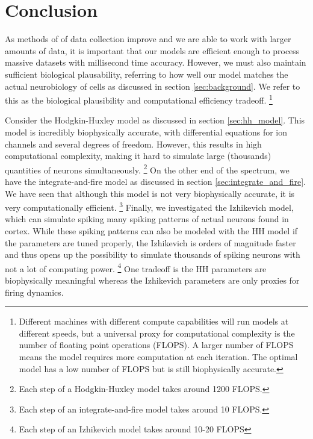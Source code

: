 \documentclass[11pt]{article}
\begin{document}
\nocite{computation-in-single-neuron-hh}

\section{Conclusion}
\label{sec:conclusion}

As methods of of data collection improve and we are able to work with larger amounts of data, it is important that our models are efficient enough to process massive datasets with millisecond time accuracy. However, we must also maintain sufficient biological plausability, referring to how well our model matches the actual neurobiology of cells as discussed in section \ref{sec:background}. We refer to this as the biological plausibility and computational efficiency tradeoff. \footnote{Different machines with different compute capabilities will run models at different speeds, but a universal proxy for computational complexity is the number of floating point operations (FLOPS). A larger number of FLOPS means the model requires more computation at each iteration. The optimal model has a low number of FLOPS but is still biophysically accurate.}

Consider the Hodgkin-Huxley model as discussed in section \ref{sec:hh_model}. This model is incredibly biophysically accurate, with differential equations for ion channels and several degrees of freedom. However, this results in high computational complexity, making it hard to simulate large (thousands) quantities of neurons simultaneously. \footnote{Each step of a Hodgkin-Huxley model takes around 1200 FLOPS.} On the other end of the spectrum, we have the integrate-and-fire model as discussed in section \ref{sec:integrate_and_fire}. We have seen that although this model is not very biophysically accurate, it is very computationally efficient. \footnote{Each step of an integrate-and-fire model takes around 10 FLOPS.} Finally, we investigated the Izhikevich model, which can simulate spiking many spiking patterns of actual neurons found in cortex. While these spiking patterns can also be modeled with the HH model if the parameters are tuned properly, the Izhikevich is orders of magnitude faster and thus opens up the possibility to simulate thousands of spiking neurons with not a lot of computing power. \footnote{Each step of an Izhikevich model takes around 10-20 FLOPS} One tradeoff is the HH parameters are biophysically meaningful whereas the Izhikevich parameters are only proxies for firing dynamics.
\end{document}
